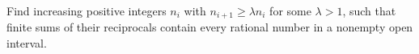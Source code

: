 Find increasing positive integers $n_i$ with $n_{i+1}\ge\lambda n_i$ for some $\lambda>1$, such that finite sums of their reciprocals contain every rational number in a nonempty open interval.
